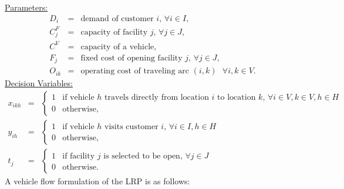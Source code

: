 \documentclass[graybox]{./styles/svmult}
\newcommand{\fvarj}{t_j}
\begin{document}
\noindent\underline{Parameters:}
\begin{eqnarray*}
D_i & = & \mbox{demand of customer $i$, $\forall i \in I$}, \\
C^F_j & = & \mbox{capacity of facility $j$, $\forall j \in J$}, \\
C^V  & = & \mbox{capacity of a vehicle}, \\
F_j & = & \mbox{fixed cost of opening facility $j$, $\forall j \in J$}, \\
O_{ik} & = & \mbox{operating cost of traveling arc $(i,k)$ $\forall i,k \in V$}. 
\end{eqnarray*}
\noindent\underline{Decision Variables:}
\begin{eqnarray*}
x_{ikh} & = & \left\{ \begin{array}{ll}
                 1  & \mbox{if vehicle $h$ travels directly from location $i$ to location $k$, $\forall i \in V, k \in V, h \in H$}\\
                 0  & \mbox{otherwise},                                                  
                \end{array} 
              \right. \\
y_{ih} & = & \left\{ \begin{array}{ll}
                 1  & \mbox{if vehicle $h$ visits customer $i$, $\forall i \in I, h \in H$}\\
                 0  & \mbox{otherwise},                                                  
                \end{array} 
              \right. \\
\fvarj & = & \left\{ \begin{array}{ll}
                1  & \mbox{if facility $j$ is selected to be open, $\forall j \in J$}\\
                 0  & \mbox{otherwise}.                                                  
                \end{array}  
              \right. 
\end{eqnarray*}
A vehicle flow formulation of the LRP is as follows: 
\end{document}
